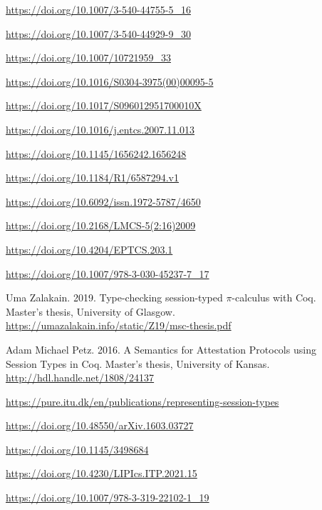 \begin{description}
\item[\cite{Gay2001}]                     \url{https://doi.org/10.1007/3-540-44755-5_16}
\item[\cite{Despeyroux2000}]              \url{https://doi.org/10.1007/3-540-44929-9_30}
\item[\cite{Gillard2000}]                 \url{https://doi.org/10.1007/10721959_33}
\item[\cite{Honsell2001}]                 \url{https://doi.org/10.1016/S0304-3975(00)00095-5}
\item[\cite{Perera2018}]                  \url{https://doi.org/10.1017/S096012951700010X}
\item[\cite{Watkins2008}]                 \url{https://doi.org/10.1016/j.entcs.2007.11.013}
\item[\cite{Tiu2010}]                     \url{https://doi.org/10.1145/1656242.1656248}
\item[\cite{Cervesato2007}]               \url{https://doi.org/10.1184/R1/6587294.v1}
\item[\cite{Baelde2014}]                  \url{https://doi.org/10.6092/issn.1972-5787/4650}
\item[\cite{Bengtson2009}]                \url{https://doi.org/10.2168/LMCS-5(2:16)2009}
\item[\cite{Orchard2016}]                 \url{https://doi.org/10.4204/EPTCS.203.1}
\item[\cite{Castro2020}]                  \url{https://doi.org/10.1007/978-3-030-45237-7_17}
\item[\cite{Zalakain2019}]                Uma Zalakain. 2019. Type-checking session-typed $\pi$-calculus with Coq. Master's thesis, University of Glasgow. \url{https://umazalakain.info/static/Z19/msc-thesis.pdf}
\item[\cite{Petz2016}]                    Adam Michael Petz. 2016. A Semantics for Attestation Protocols using Session Types in Coq. Master's thesis, University of Kansas. \url{http://hdl.handle.net/1808/24137}
\item[\cite{Bock2016}]                    \url{https://pure.itu.dk/en/publications/representing-session-types}
\item[\cite{Xi2016}]                      \url{https://doi.org/10.48550/arXiv.1603.03727}
\item[\cite{Hirsch2022}]                  \url{https://doi.org/10.1145/3498684}
\item[\cite{Cruz-Filipe2021b}]            \url{https://doi.org/10.4230/LIPIcs.ITP.2021.15}
\item[\cite{Maksimovic2015}]              \url{https://doi.org/10.1007/978-3-319-22102-1_19}

\end{description}
